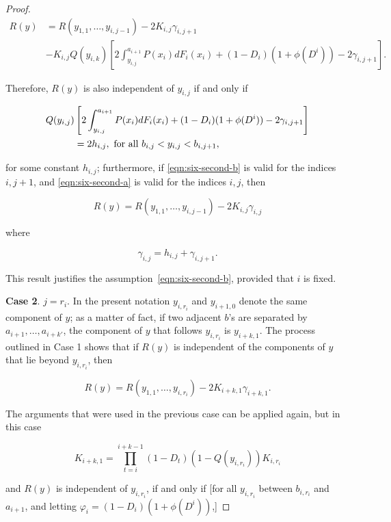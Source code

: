 \documentclass{article}
\begin{document}
\begin{proof}
\[
\begin{aligned}
R(y) &= R(y_{1, 1}, \dots, y_{i, j-1}) - 2K_{i, j} \gamma_{i, j+1} \\
&- K_{i, j} Q(y_{i, k}) \left [
2 \int_{y_{i, j}}^{a_{i+1}} P(x_i) dF_i(x_i) + (1-D_i)(1 + \phi(D^i)) - 2
\gamma_{i, j+1}
\right ].
\end{aligned}
\]

Therefore, $R(y)$ is also independent of $y_{i, j}$ if and only if

\begin{align}
Q(y_{i, j}) &
\left [
2 \int_{y_{i, j}}^{a_{i+1}} P(x_i) dF_i(x_i) + (1 - D_i) (1 + \phi(D^i)) -
2\gamma_{i, j+1}
\right ] \label{eqn:six-second-a} \\
&= 2h_{i, j}, \textup{ for all } b_{i, j} < y_{i, j} < b_{i, j+1}, \notag
\end{align}

for some constant $h_{i, j}$; furthermore, if \eqref{eqn:six-second-b} is valid
for the indices $i, j+1$, and \eqref{eqn:six-second-a} is valid for the indices
$i, j$, then

\[
R(y) = R(y_{1, 1}, \dots, y_{i, j-1}) - 2K_{i, j} \gamma_{i, j}
\]

where

\begin{equation}
\gamma_{i, j} = h_{i,j} + \gamma_{i, j+1}. \label{eqn:six-two}
\end{equation}

This result justifies the assumption~\eqref{eqn:six-second-b}, provided that
$i$ is fixed.

\textbf{Case 2}. $j = r_i$. In the present notation $y_{i, r_i}$ and $y_{i+1,
0}$ denote the same component of $y$; as a matter of fact, if two adjacent
$b$'s are separated by $a_{i+1}, \dots, a_{i + k'}$, the component of $y$ that
follows $y_{i, r_i}$ is $y_{i+k, 1}$. The process outlined in Case 1 shows that
if $R(y)$ is independent of the components of $y$ that lie beyond $y_{i,
r_i}$, then

\[
R(y) = R(y_{1, 1}, \dots, y_{i, r_i}) - 2K_{i+k, 1} \gamma_{i+k, 1}.
\]

The arguments that were used in the previous case can be applied again, but in
this case

\[
K_{i+k, 1} = \prod_{t=i}^{i+k-1} (1 - D_t) (1 - Q(y_{i, r_i})) K_{i, r_i}
\]

and $R(y)$ is independent of $y_{i, r_i}$, if and only if [for all $y_{i, r_i}$
between $b_{i, r_i}$ and $a_{i+1}$, and letting $\varphi_i = (1-D_i)(1 +
\phi(D^i))$,]


\end{proof}
\end{document}
